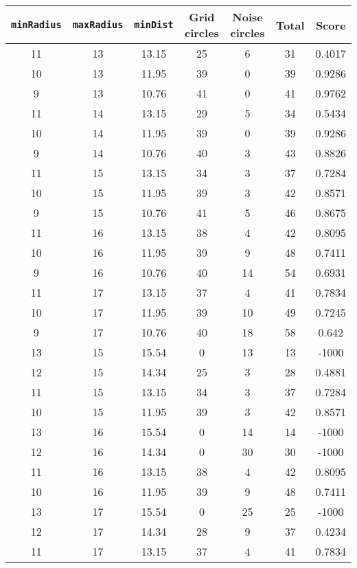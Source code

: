 \documentclass[letterpaper, 12pt]{article}
\begin{document}
\begin{longtable}{|c|c|c|c|c|c|c|}
\hline
\textbf{\texttt{minRadius}} & \textbf{\texttt{maxRadius}} & \textbf{\texttt{minDist}} & \textbf{Grid circles} & \textbf{Noise circles} & \textbf{Total} & \textbf{Score} \\
\hline
11 & 13 & 13.15 & 25 & 6 & 31 & 0.4017 \\
\hline
10 & 13 & 11.95 & 39 & 0 & 39 & 0.9286 \\
\hline
9 & 13 & 10.76 & 41 & 0 & 41 & 0.9762 \\
\hline
11 & 14 & 13.15 & 29 & 5 & 34 & 0.5434 \\
\hline
10 & 14 & 11.95 & 39 & 0 & 39 & 0.9286 \\
\hline
9 & 14 & 10.76 & 40 & 3 & 43 & 0.8826 \\
\hline
11 & 15 & 13.15 & 34 & 3 & 37 & 0.7284 \\
\hline
10 & 15 & 11.95 & 39 & 3 & 42 & 0.8571 \\
\hline
9 & 15 & 10.76 & 41 & 5 & 46 & 0.8675 \\
\hline
11 & 16 & 13.15 & 38 & 4 & 42 & 0.8095 \\
\hline
10 & 16 & 11.95 & 39 & 9 & 48 & 0.7411 \\
\hline
9 & 16 & 10.76 & 40 & 14 & 54 & 0.6931 \\
\hline
11 & 17 & 13.15 & 37 & 4 & 41 & 0.7834 \\
\hline
10 & 17 & 11.95 & 39 & 10 & 49 & 0.7245 \\
\hline
9 & 17 & 10.76 & 40 & 18 & 58 & 0.642 \\
\hline
13 & 15 & 15.54 & 0 & 13 & 13 & -1000 \\
\hline
12 & 15 & 14.34 & 25 & 3 & 28 & 0.4881 \\
\hline
11 & 15 & 13.15 & 34 & 3 & 37 & 0.7284 \\
\hline
10 & 15 & 11.95 & 39 & 3 & 42 & 0.8571 \\
\hline
13 & 16 & 15.54 & 0 & 14 & 14 & -1000 \\
\hline
12 & 16 & 14.34 & 0 & 30 & 30 & -1000 \\
\hline
11 & 16 & 13.15 & 38 & 4 & 42 & 0.8095 \\
\hline
10 & 16 & 11.95 & 39 & 9 & 48 & 0.7411 \\
\hline
13 & 17 & 15.54 & 0 & 25 & 25 & -1000 \\
\hline
12 & 17 & 14.34 & 28 & 9 & 37 & 0.4234 \\
\hline
11 & 17 & 13.15 & 37 & 4 & 41 & 0.7834 \\

\end{longtable}
\end{document}
